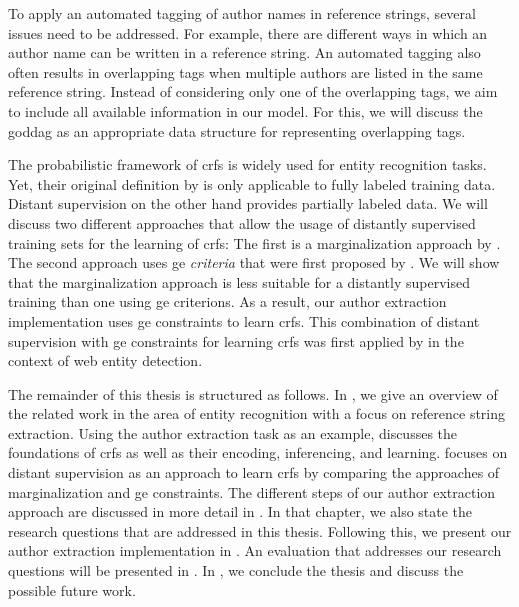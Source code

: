 To apply an automated tagging of author names in reference strings, several issues need to be addressed.
For example, there are different ways in which an author name can be written in a reference string.
An automated tagging also often results in overlapping tags when multiple authors are listed in the same reference string.
Instead of considering only one of the overlapping tags, we aim to include all available information in our model.
For this, we will discuss the \gls{goddag} as an appropriate data structure for representing overlapping tags.

The probabilistic framework of \glspl{crf} is widely used for entity recognition tasks.
Yet, their original definition by \citet{lafferty2001conditional} is only applicable to fully labeled training data.
Distant supervision on the other hand provides partially labeled data.
We will discuss two different approaches that allow the usage of distantly supervised training sets for the learning of \glspl{crf}:
The first is a marginalization approach by \citet{tsuboi2008training}.
The second approach uses \gls{ge} \textit{criteria} that were first proposed by \citet{mann2007simple}.
We will show that the marginalization approach is less suitable for a distantly supervised training than one using \glspl{ge criterion}.
As a result, our author extraction implementation uses \glspl{ge constraint} to learn \glspl{crf}.
This combination of distant supervision with \glspl{ge constraint} for learning \glspl{crf} was first applied by \citet{lu2013web} in the context of web entity detection.

\bigskip

The remainder of this thesis is structured as follows.
In , we give an overview of the related work in the area of entity recognition with a focus on reference string extraction.
Using the author extraction task as an example,  discusses the foundations of \glspl{crf} as well as their encoding, inferencing, and learning.
 focuses on distant supervision as an approach to learn \glspl{crf} by comparing the approaches of marginalization and \gls{ge} constraints.
The different steps of our author extraction approach are discussed in more detail in .
In that chapter, we also state the research questions that are addressed in this thesis.
Following this, we present our author extraction implementation in .
An evaluation that addresses our research questions will be presented in .
In , we conclude the thesis and discuss the possible future work.

